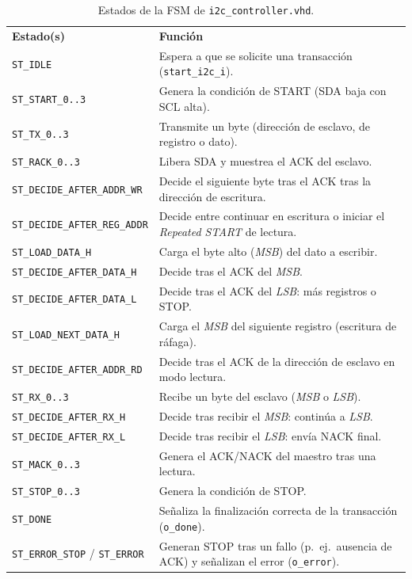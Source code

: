 \documentclass[../main.tex]{subfiles}
\begin{document}
\begin{table}[H]
\centering
\footnotesize
\caption{Estados de la FSM de \texttt{i2c\_controller.vhd}.}
\label{tab:i2c_fsm}
\renewcommand{\arraystretch}{1.25}
\begin{tabularx}{\textwidth}{>{\raggedright\arraybackslash}p{3.6cm}>{\raggedright\arraybackslash}X}
\rowcolor[HTML]{156082}
{\color{white}\textbf{Estado(s)}} & {\color{white}\textbf{Función}} \\
\rowcolor[HTML]{C0E6F5}
\texttt{ST\_IDLE} & Espera a que se solicite una transacción (\texttt{start\_i2c\_i}). \\
\texttt{ST\_START\_0..3} & Genera la condición de START (\ac{SDA} baja con \ac{SCL} alta). \\
\rowcolor[HTML]{C0E6F5}
\texttt{ST\_TX\_0..3} & Transmite un byte (dirección de esclavo, de registro o dato). \\
\texttt{ST\_RACK\_0..3} & Libera \ac{SDA} y muestrea el ACK del esclavo. \\
\rowcolor[HTML]{C0E6F5}
\texttt{ST\_DECIDE\_AFTER\_ADDR\_WR} & Decide el siguiente byte tras el ACK tras la dirección de escritura. \\
\texttt{ST\_DECIDE\_AFTER\_REG\_ADDR} & Decide entre continuar en escritura o iniciar el \textit{Repeated START} de lectura. \\
\rowcolor[HTML]{C0E6F5}
\texttt{ST\_LOAD\_DATA\_H} & Carga el byte alto (\textit{MSB}) del dato a escribir. \\
\texttt{ST\_DECIDE\_AFTER\_DATA\_H} & Decide tras el ACK del \textit{MSB}. \\
\rowcolor[HTML]{C0E6F5}
\texttt{ST\_DECIDE\_AFTER\_DATA\_L} & Decide tras el ACK del \textit{LSB}: más registros o STOP. \\
\texttt{ST\_LOAD\_NEXT\_DATA\_H} & Carga el \textit{MSB} del siguiente registro (escritura de ráfaga). \\
\rowcolor[HTML]{C0E6F5}
\texttt{ST\_DECIDE\_AFTER\_ADDR\_RD} & Decide tras el ACK de la dirección de esclavo en modo lectura. \\
\texttt{ST\_RX\_0..3} & Recibe un byte del esclavo (\textit{MSB} o \textit{LSB}). \\
\rowcolor[HTML]{C0E6F5}
\texttt{ST\_DECIDE\_AFTER\_RX\_H} & Decide tras recibir el \textit{MSB}: continúa a \textit{LSB}. \\
\texttt{ST\_DECIDE\_AFTER\_RX\_L} & Decide tras recibir el \textit{LSB}: envía NACK final. \\
\rowcolor[HTML]{C0E6F5}
\texttt{ST\_MACK\_0..3} & Genera el ACK/NACK del maestro tras una lectura. \\
\texttt{ST\_STOP\_0..3} & Genera la condición de STOP. \\
\rowcolor[HTML]{C0E6F5}
\texttt{ST\_DONE} & Señaliza la finalización correcta de la transacción (\texttt{o\_done}). \\
\texttt{ST\_ERROR\_STOP} / \texttt{ST\_ERROR} & Generan STOP tras un fallo (p.~ej.\ ausencia de ACK) y señalizan el error (\texttt{o\_error}). \\
\end{tabularx}
\end{table}
\end{document}
